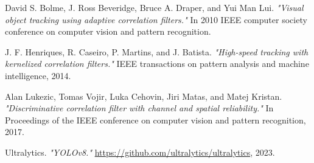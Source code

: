 \documentclass[12pt, a4paper]{report}
\begin{document}
\begin{thebibliography}{9}

David S. Bolme, J. Ross Beveridge, Bruce A. Draper, and Yui Man Lui.
\textit{"Visual object tracking using adaptive correlation filters."}
In 2010 IEEE computer society conference on computer vision and pattern recognition.

J. F. Henriques, R. Caseiro, P. Martins, and J. Batista.
\textit{"High-speed tracking with kernelized correlation filters."}
IEEE transactions on pattern analysis and machine intelligence, 2014.

Alan Lukezic, Tomas Vojir, Luka Cehovin, Jiri Matas, and Matej Kristan.
\textit{"Discriminative correlation filter with channel and spatial reliability."}
In Proceedings of the IEEE conference on computer vision and pattern recognition, 2017.

Ultralytics.
\textit{"YOLOv8."}
\url{https://github.com/ultralytics/ultralytics}, 2023.

\end{thebibliography} %
\end{document}

